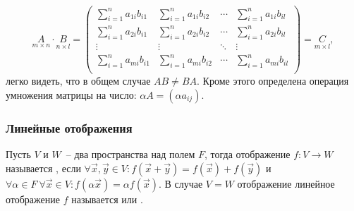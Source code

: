     \begin{equation}
        \underset{m \times n}{A} \cdot \underset{n \times l}{B}
        = \begin{pmatrix}
            \sum\limits_{i=1}^{n} a_{1i} b_{i1} & \sum\limits_{i=1}^{n} a_{1i} b_{i2} & \cdots & \sum\limits_{i=1}^{n} a_{1i} b_{il}\\
            \sum\limits_{i=1}^{n} a_{2i} b_{i1} & \sum\limits_{i=1}^{n} a_{2i} b_{i2} & \cdots & \sum\limits_{i=1}^{n} a_{2i} b_{il}\\
            \vdots & \vdots & \ddots & \vdots\\
            \sum\limits_{i=1}^{n} a_{mi} b_{i1} & \sum\limits_{i=1}^{n} a_{mi} b_{i2} & \cdots & \sum\limits_{i=1}^{n} a_{m    i} b_{il}\\
        \end{pmatrix} = \underset{m \times l}{C},
    \end{equation}
    легко видеть, что в общем случае $A B \not = B A$. Кроме этого определена операция умножения матрицы на число: $\alpha A = (\alpha a_{ij})$.
    
    \subsubsection{Линейные отображения}
    
    Пусть $V$ и $W$~-- два пространства над полем $F$, тогда отображение $f: V \rightarrow W$ называется , если $\forall \vec{x}, \vec{y} \in V: f(\vec{x} + \vec{y}) = f(\vec{x}) + f(\vec{y})$ и $\forall \alpha \in F ~\forall \vec{x} \in V: f(\alpha\vec{x}) = \alpha f(\vec{x})$. В случае $V = W$ отображение линейное отображение $f$ называется  или .\cite{vinberg}
    
